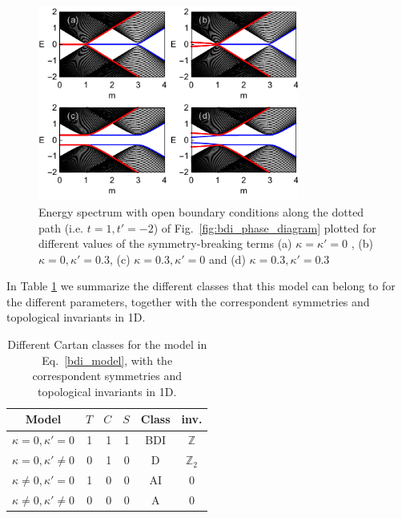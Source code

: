 \documentclass[twocolumn,amsmath,longbibliography,amssymb,superscriptaddress]{revtex4-1}
\begin{document}
\begin{figure}[h!]
\centering
\includegraphics[width=86mm]{fig2comp.pdf}
\caption{Energy spectrum with open boundary conditions along the dotted path (i.e. $t=1,t'=-2$) of Fig.~\ref{fig:bdi_phase_diagram} plotted for different values of the symmetry-breaking terms (a) $\kappa =\kappa'=0$ , (b) $\kappa = 0, \kappa'=0.3$, (c) $\kappa = 0.3,\kappa'=0$ and (d) $\kappa = 0.3,\kappa'=0.3$}
\label{fig:zero_E_modes}
\end{figure}

In Table \ref{fig:class_table} we summarize the different classes that this model can belong to for the different parameters, together with the correspondent symmetries and topological invariants in 1D. 


\begin{table}[h]
\centering %
\begin{tabular}{|c |rrr| c|c|} %
\hline\hline %
Model &  $T$ & $C$ & $S$ & Class & inv.  \\  [1ex] 
\hline
$\kappa =0,\kappa'=0$ &  1 & 1 & 1 & BDI  & $\mathbb{Z}$\\  [1ex] 
$\kappa =0,\kappa' \neq0$ &  0 & 1 & 0 & D  & $\mathbb{Z}_2$ \\  [1ex] 
$\kappa \neq 0,\kappa'=0$ &  1 & 0 & 0 & AI & 0 \\  [1ex] 
$\kappa \neq 0,\kappa' \neq 0$ &  0 & 0 & 0 & A & 0  \\  [1ex] 
\hline \hline%
\end{tabular}
\caption{Different Cartan classes for the model in Eq.~\eqref{bdi_model}, with the correspondent symmetries and topological invariants in 1D.} 
\label{fig:class_table}
\end{table}



\end{document}
